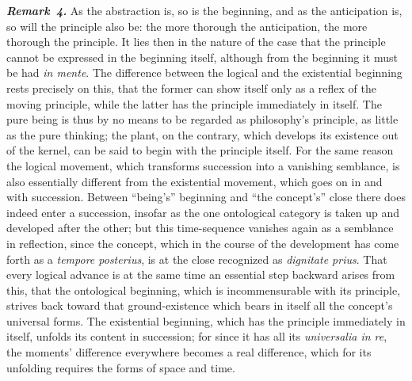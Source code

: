 \documentclass[12pt]{book}
\newcommand{\anm}[1]{\emph{\textbf{Remark~#1.}}}
\begin{document}
\anm{4} As the abstraction is, so is the beginning, and as the anticipation
is, so will the principle also be: the more thorough the anticipation, the
more thorough the principle. It lies then in the nature of the case that the
principle cannot be expressed in the beginning itself, although from the
beginning it must be had \textit{in mente}. The difference between the
logical and the existential beginning rests precisely on this, that the
former can show itself only as a reflex of the moving principle, while the
latter has the principle immediately in itself. The pure being is thus by no
means to be regarded as philosophy's principle, as little as the pure
thinking; the plant, on the contrary, which develops its existence out of
the kernel, can be said to begin with the principle itself. For the same
reason the logical movement, which transforms succession into a vanishing
semblance, is also essentially different from the existential movement,
which goes on in and with succession. Between ``being's'' beginning and
``the concept's'' close there does indeed enter a succession, insofar as the
one ontological category is taken up and developed after the other; but this
time-sequence vanishes again as a semblance in reflection, since the
concept, which in the course of the development has come forth as a
\textit{tempore posterius}, is at the close recognized as \textit{dignitate
prius}. That every logical advance is at the same time an essential step
backward arises from this, that the ontological beginning, which is
incommensurable with its principle, strives back toward that ground-existence
which bears in itself all the concept's universal forms. The existential
beginning, which has the principle immediately in itself, unfolds its
content in succession; for since it has all its \textit{universalia in re},
the moments' difference everywhere becomes a real difference, which for its
unfolding requires the forms of space and time.
\end{document}
